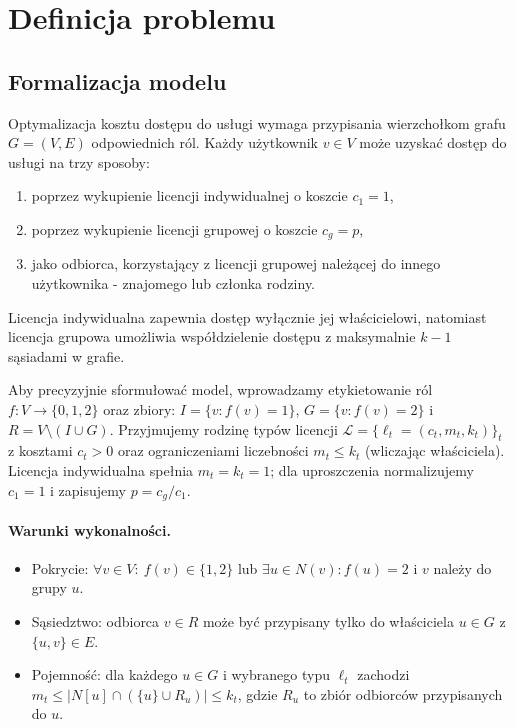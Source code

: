 \section{Definicja problemu}

\subsection{Formalizacja modelu}
\label{sec:model-formal}

Optymalizacja kosztu dostępu do usługi wymaga przypisania wierzchołkom grafu $G = (V, E)$ odpowiednich ról. Każdy użytkownik $v \in V$ może uzyskać dostęp do usługi na trzy sposoby:
\begin{enumerate}
    \item poprzez wykupienie licencji indywidualnej o koszcie $c_1 = 1$,
    \item poprzez wykupienie licencji grupowej o koszcie $c_g = p$,
    \item jako odbiorca, korzystający z licencji grupowej należącej do innego  użytkownika - znajomego lub członka rodziny.
\end{enumerate}
Licencja indywidualna zapewnia dostęp wyłącznie jej właścicielowi, natomiast licencja grupowa umożliwia współdzielenie dostępu z maksymalnie $k-1$ sąsiadami w grafie.

\noindent Aby precyzyjnie sformułować model, wprowadzamy etykietowanie ról $f:V\to\{0,1,2\}$ oraz zbiory: $I=\{v:f(v)=1\}$, $G=\{v:f(v)=2\}$ i $R=V\setminus(I\cup G)$. Przyjmujemy rodzinę typów licencji $\mathcal{L}=\{\ell_t=(c_t,m_t,k_t)\}_t$ z kosztami $c_t>0$ oraz ograniczeniami liczebności $m_t\le k_t$ (wliczając właściciela). Licencja indywidualna spełnia $m_t=k_t=1$; dla uproszczenia normalizujemy $c_1=1$ i zapisujemy $p=c_g/c_1$.

\paragraph{Warunki wykonalności.}
\begin{itemize}
  \item Pokrycie: $\forall v\in V:\ f(v)\in\{1,2\}$ lub $\exists u\in N(v): f(u)=2$ i $v$ należy do grupy $u$.
  \item Sąsiedztwo: odbiorca $v\in R$ może być przypisany tylko do właściciela $u\in G$ z $\{u,v\}\in E$.
  \item Pojemność: dla każdego $u\in G$ i wybranego typu $\ell_t$ zachodzi $m_t\le |N[u]\cap (\{u\}\cup R_u)|\le k_t$, gdzie $R_u$ to zbiór odbiorców przypisanych do $u$.
\end{itemize}

